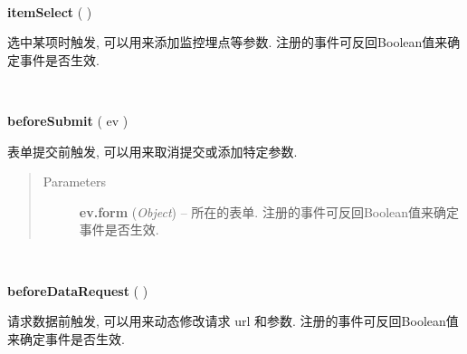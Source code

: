 \documentclass[letterpaper,10pt,english]{sphinxmanual}
\begin{document}

\begin{fulllineitems}
\label{api/component/suggest/index:Suggest.itemSelect}~
\begin{DUlineblock}{0em}
\item[] \textbf{itemSelect} ( )
\item[] 选中某项时触发, 可以用来添加监控埋点等参数. 注册的事件可反回Boolean值来确定事件是否生效.
\end{DUlineblock}

\end{fulllineitems}



\begin{fulllineitems}
\label{api/component/suggest/index:Suggest.beforeSubmit}~
\begin{DUlineblock}{0em}
\item[] \textbf{beforeSubmit} ( ev )
\item[] 表单提交前触发, 可以用来取消提交或添加特定参数.
\end{DUlineblock}
\begin{quote}\begin{description}
\item[{Parameters}] \leavevmode
\textbf{ev.form} (\emph{Object}) -- 所在的表单. 注册的事件可反回Boolean值来确定事件是否生效.

\end{description}\end{quote}

\end{fulllineitems}



\begin{fulllineitems}
\label{api/component/suggest/index:Suggest.beforeDataRequest}~
\begin{DUlineblock}{0em}
\item[] \textbf{beforeDataRequest} ( )
\item[] 请求数据前触发, 可以用来动态修改请求 url 和参数. 注册的事件可反回Boolean值来确定事件是否生效.
\end{DUlineblock}

\end{fulllineitems}
\end{document}
